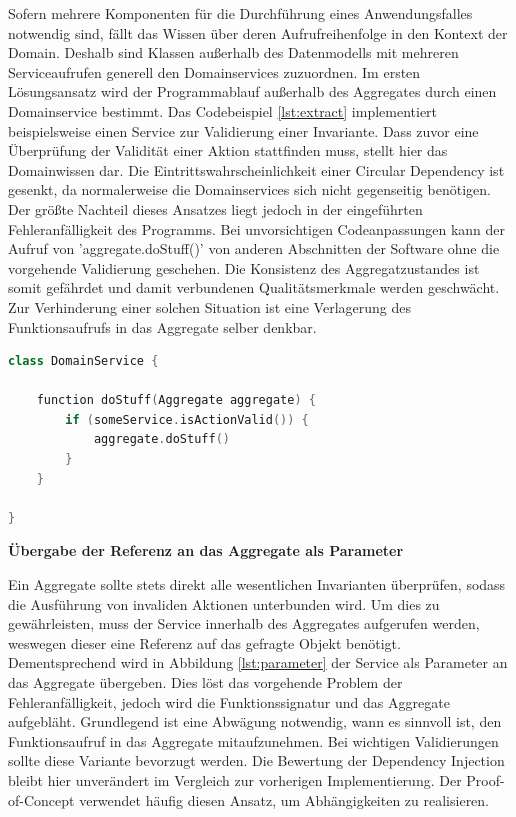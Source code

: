 Sofern mehrere Komponenten für die Durchführung eines Anwendungsfalles notwendig sind, fällt das Wissen über deren Aufrufreihenfolge in den Kontext der Domain. Deshalb sind Klassen außerhalb des Datenmodells mit mehreren Serviceaufrufen generell den Domainservices zuzuordnen. Im ersten Lösungsansatz wird der Programmablauf außerhalb des Aggregates durch einen Domainservice bestimmt. Das Codebeispiel \ref{lst:extract} implementiert beispielsweise einen Service zur Validierung einer Invariante. Dass zuvor eine Überprüfung der Validität einer Aktion stattfinden muss, stellt hier das Domainwissen dar. Die Eintrittswahrscheinlichkeit einer Circular Dependency ist gesenkt, da normalerweise die Domainservices sich nicht gegenseitig benötigen. Der größte Nachteil dieses Ansatzes liegt jedoch in der eingeführten Fehleranfälligkeit des Programms. Bei unvorsichtigen Codeanpassungen kann der Aufruf von 'aggregate.doStuff()' von anderen Abschnitten der Software ohne die vorgehende Validierung geschehen. Die Konsistenz des Aggregatzustandes ist somit gefährdet und damit verbundenen Qualitätsmerkmale werden geschwächt. Zur Verhinderung einer solchen Situation ist eine Verlagerung des Funktionsaufrufs in das Aggregate selber denkbar.

\begin{minipage}{\linewidth} %
	\begin{lstlisting}[caption={Bestimmung des Steuerflusses durch einen Domainservice}, label={lst:extract}, language=Kotlin]
class DomainService {
	
	function doStuff(Aggregate aggregate) {
		if (someService.isActionValid()) {     
			aggregate.doStuff()
		}
	}

}
	\end{lstlisting}
\end{minipage}


\textbf{Übergabe der Referenz an das Aggregate als Parameter}

Ein Aggregate sollte stets direkt alle wesentlichen Invarianten überprüfen, sodass die Ausführung von invaliden Aktionen unterbunden wird. Um dies zu gewährleisten, muss der Service innerhalb des Aggregates aufgerufen werden, weswegen dieser eine Referenz auf das gefragte Objekt benötigt. Dementsprechend wird in Abbildung \ref{lst:parameter} der Service als Parameter an das Aggregate übergeben. Dies löst das vorgehende Problem der Fehleranfälligkeit, jedoch wird die Funktionssignatur und das Aggregate aufgebläht. Grundlegend ist eine Abwägung notwendig, wann es sinnvoll ist, den Funktionsaufruf in das Aggregate mitaufzunehmen. Bei wichtigen Validierungen sollte diese Variante bevorzugt werden. Die Bewertung der Dependency Injection bleibt hier unverändert im Vergleich zur vorherigen Implementierung. Der Proof-of-Concept verwendet häufig diesen Ansatz, um Abhängigkeiten zu realisieren.


